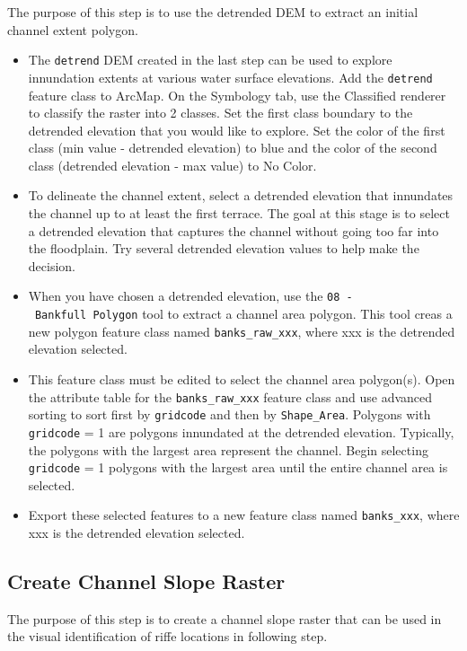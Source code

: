 \documentclass[]{book}
\providecommand{\tightlist}{%
  \setlength{\itemsep}{0pt}\setlength{\parskip}{0pt}}
\theoremstyle{definition}
\theoremstyle{definition}
\theoremstyle{definition}
\theoremstyle{remark}
\begin{document}
The purpose of this step is to use the detrended DEM to extract an
initial channel extent polygon.

\begin{itemize}
\tightlist
\item
  The \texttt{detrend} DEM created in the last step can be used to
  explore innundation extents at various water surface elevations. Add
  the \texttt{detrend} feature class to ArcMap. On the Symbology tab,
  use the Classified renderer to classify the raster into 2 classes. Set
  the first class boundary to the detrended elevation that you would
  like to explore. Set the color of the first class (min value -
  detrended elevation) to blue and the color of the second class
  (detrended elevation - max value) to No Color.
\item
  To delineate the channel extent, select a detrended elevation that
  innundates the channel up to at least the first terrace. The goal at
  this stage is to select a detrended elevation that captures the
  channel without going too far into the floodplain. Try several
  detrended elevation values to help make the decision.
\item
  When you have chosen a detrended elevation, use the
  \texttt{08\ -\ Bankfull\ Polygon} tool to extract a channel area
  polygon. This tool creas a new polygon feature class named
  \texttt{banks\_raw\_xxx}, where xxx is the detrended elevation
  selected.
\item
  This feature class must be edited to select the channel area
  polygon(s). Open the attribute table for the \texttt{banks\_raw\_xxx}
  feature class and use advanced sorting to sort first by
  \texttt{gridcode} and then by \texttt{Shape\_Area}. Polygons with
  \texttt{gridcode} = 1 are polygons innundated at the detrended
  elevation. Typically, the polygons with the largest area represent the
  channel. Begin selecting \texttt{gridcode} = 1 polygons with the
  largest area until the entire channel area is selected.
\item
  Export these selected features to a new feature class named
  \texttt{banks\_xxx}, where xxx is the detrended elevation selected.
\end{itemize}

\subsection{Create Channel Slope
Raster}\label{create-channel-slope-raster}

The purpose of this step is to create a channel slope raster that can be
used in the visual identification of riffe locations in following step.
\end{document}
